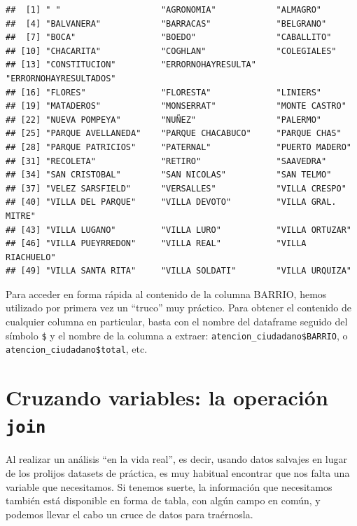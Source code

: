 \documentclass[spanish,]{book}
\begin{document}
\begin{verbatim}
##  [1] " "                    "AGRONOMIA"            "ALMAGRO"             
##  [4] "BALVANERA"            "BARRACAS"             "BELGRANO"            
##  [7] "BOCA"                 "BOEDO"                "CABALLITO"           
## [10] "CHACARITA"            "COGHLAN"              "COLEGIALES"          
## [13] "CONSTITUCION"         "ERRORNOHAYRESULTA"    "ERRORNOHAYRESULTADOS"
## [16] "FLORES"               "FLORESTA"             "LINIERS"             
## [19] "MATADEROS"            "MONSERRAT"            "MONTE CASTRO"        
## [22] "NUEVA POMPEYA"        "NUÑEZ"                "PALERMO"             
## [25] "PARQUE AVELLANEDA"    "PARQUE CHACABUCO"     "PARQUE CHAS"         
## [28] "PARQUE PATRICIOS"     "PATERNAL"             "PUERTO MADERO"       
## [31] "RECOLETA"             "RETIRO"               "SAAVEDRA"            
## [34] "SAN CRISTOBAL"        "SAN NICOLAS"          "SAN TELMO"           
## [37] "VELEZ SARSFIELD"      "VERSALLES"            "VILLA CRESPO"        
## [40] "VILLA DEL PARQUE"     "VILLA DEVOTO"         "VILLA GRAL. MITRE"   
## [43] "VILLA LUGANO"         "VILLA LURO"           "VILLA ORTUZAR"       
## [46] "VILLA PUEYRREDON"     "VILLA REAL"           "VILLA RIACHUELO"     
## [49] "VILLA SANTA RITA"     "VILLA SOLDATI"        "VILLA URQUIZA"
\end{verbatim}

Para acceder en forma rápida al contenido de la columna BARRIO, hemos utilizado por primera vez un ``truco'' muy práctico. Para obtener el contenido de cualquier columna en particular, basta con el nombre del dataframe seguido del símbolo \texttt{\$} y el nombre de la columna a extraer: \texttt{atencion\_ciudadano\$BARRIO}, o \texttt{atencion\_ciudadano\$total}, etc.

\hypertarget{cruzando-variables-la-operacion-join}{%
\section{\texorpdfstring{Cruzando variables: la operación \texttt{join}}{Cruzando variables: la operación join}}\label{cruzando-variables-la-operacion-join}}

Al realizar un análisis ``en la vida real'', es decir, usando datos salvajes en lugar de los prolijos datasets de práctica, es muy habitual encontrar que nos falta una variable que necesitamos. Si tenemos suerte, la información que necesitamos también está disponible en forma de tabla, con algún campo en común, y podemos llevar el cabo un cruce de datos para traérnosla.
\end{document}
